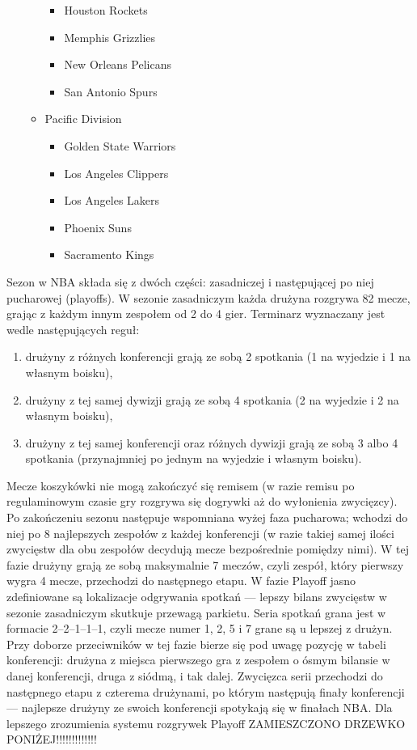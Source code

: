 \documentclass[inzynierska]{pwr_wmat_praca_dyplomowa}
\theoremstyle{plain}
\numberwithin{theorem}{chapter}
\theoremstyle{definition}
\numberwithin{theorem}{chapter}
\begin{document}
\begin{itemize}
\begin{itemize}
\begin{itemize}
			\item Houston Rockets
			\item Memphis Grizzlies
			\item New Orleans Pelicans
			\item San Antonio Spurs
		\end{itemize}
		\item Pacific Division
		\begin{itemize}
			\item Golden State Warriors
			\item Los Angeles Clippers
			\item Los Angeles Lakers
			\item Phoenix Suns
			\item Sacramento Kings
		\end{itemize}
	\end{itemize}
\end{itemize} 

Sezon w NBA składa się z dwóch części: zasadniczej i następującej po niej pucharowej (playoffs). W sezonie zasadniczym każda drużyna rozgrywa 82 mecze, grając z każdym innym zespołem od 2 do 4 gier. Terminarz wyznaczany jest wedle następujących reguł:
\begin{enumerate}
	\item drużyny z różnych konferencji grają ze sobą 2 spotkania (1 na wyjedzie i 1 na własnym boisku),
	\item drużyny z tej samej dywizji grają ze sobą 4 spotkania (2 na wyjedzie i 2 na własnym boisku),
	\item drużyny z tej samej konferencji oraz różnych dywizji grają ze sobą 3 albo 4 spotkania (przynajmniej po jednym na wyjedzie i własnym boisku).
\end{enumerate}
Mecze koszykówki nie mogą zakończyć się remisem (w razie remisu po regulaminowym czasie gry rozgrywa się dogrywki aż do wyłonienia zwycięzcy).
Po zakończeniu sezonu następuje wspomniana wyżej faza pucharowa; wchodzi do niej po 8 najlepszych zespołów z każdej konferencji (w razie takiej samej ilości zwycięstw dla obu zespołów decydują mecze bezpośrednie pomiędzy nimi). W tej fazie drużyny grają ze sobą maksymalnie 7 meczów, czyli zespół, który pierwszy wygra 4 mecze, przechodzi do następnego etapu. W fazie Playoff jasno zdefiniowane są lokalizacje odgrywania spotkań --- lepszy bilans zwycięstw w sezonie zasadniczym skutkuje przewagą parkietu. Seria spotkań grana jest w formacie 2–2–1–1–1, czyli mecze numer 1, 2, 5 i 7 grane są u lepszej z drużyn. Przy doborze przeciwników w tej fazie bierze się pod uwagę pozycję w tabeli konferencji: drużyna z miejsca pierwszego gra z zespołem o ósmym bilansie w danej konferencji, druga z siódmą, i tak dalej. Zwycięzca serii przechodzi do następnego etapu z czterema drużynami, po którym następują finały konferencji --- najlepsze drużyny ze swoich konferencji spotykają się w finałach NBA. Dla lepszego zrozumienia systemu rozgrywek Playoff ZAMIESZCZONO DRZEWKO PONIŻEJ!!!!!!!!!!!!! 
\end{document}
